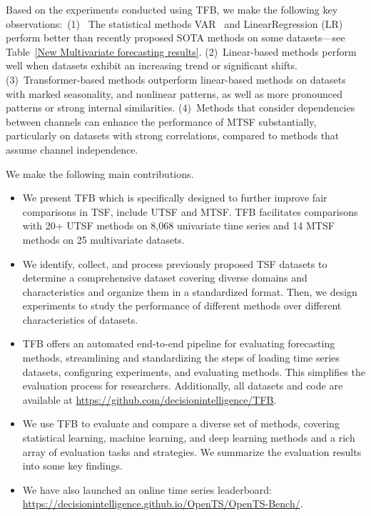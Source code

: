 \documentclass[sigconf, nonacm, pdfa]{acmart}
\begin{document}
Based on the experiments conducted using TFB, we make the following key observations:~(1)~ The statistical methods VAR~\cite{toda1994vector} and LinearRegression (LR)~\cite{kedem2005regression,herzen2022darts} perform better than recently proposed SOTA methods on some datasets---see Table~\ref{New Multivariate forecasting results}. (2)~Linear-based methods perform well when datasets exhibit an increasing trend or significant shifts. (3)~Transformer-based methods outperform linear-based methods on datasets with marked seasonality, and nonlinear patterns, as well as more pronounced patterns or strong internal similarities. (4)~Methods that consider dependencies between channels can enhance the performance of MTSF substantially, particularly on datasets with strong correlations, compared to methods that assume channel independence.

We make the following main contributions.
\begin{itemize}[left=0.1cm]
\item We present TFB which is specifically designed to further improve fair comparisons in TSF, include UTSF and MTSF. TFB facilitates comparisons with 20+ UTSF methods on 8,068 univariate time series and 14 MTSF methods on 25 multivariate datasets. 
\item We identify, collect, and process previously proposed TSF datasets to determine a comprehensive dataset covering diverse domains and characteristics and organize them in a standardized format. 
Then, we design experiments to study the performance of different methods over different characteristics of datasets. 
\item TFB offers an automated end-to-end pipeline for evaluating forecasting methods, streamlining and standardizing the steps of loading time series datasets, configuring experiments, and evaluating methods. This simplifies the evaluation process for researchers. Additionally, all datasets and code are available at \href{https://github.com/decisionintelligence/TFB}{https://github.com/decisionintelligence/TFB}.
\item We use TFB to evaluate and compare a diverse set of methods, covering statistical learning, machine learning, and deep learning methods and a rich array of evaluation tasks and strategies. We summarize the evaluation results into some key findings. 
\item We have also launched an online time series leaderboard: \url{https://decisionintelligence.github.io/OpenTS/OpenTS-Bench/}.
\end{itemize}
\end{document}

